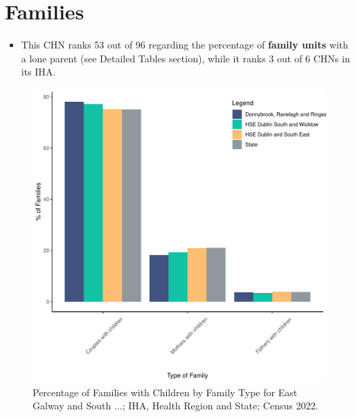 \documentclass{article}
\begin{document}
\section{Families}\label{sect:Fam}
\begin{itemize}
\item This CHN ranks  53 out of 96 regarding the percentage of \textbf{family units} with a lone parent (see Detailed Tables section), while it ranks   3 out of 6 CHNs in its IHA.
\end{itemize}
\begin{figure}[H]
	\centering
	\includegraphics[width = 150mm]{../figures/FamED.pdf}
	\caption{Percentage of Families with Children by Family Type for East Galway and South ...; IHA, Health Region and State; Census 2022.}
	\label{fig:vbnv}
	\end{figure}
	
\end{document}
